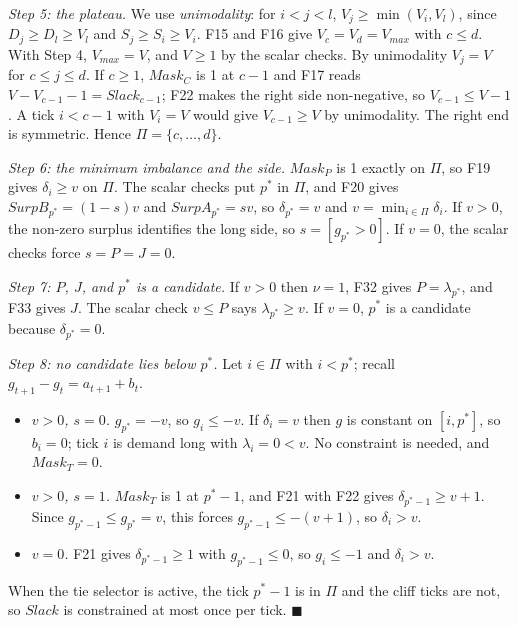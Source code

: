 \emph{Step 5: the plateau.} We use \emph{unimodality}: for \(i < j < l\), \(V_j \ge \min(V_i, V_l)\), since \(D_j \ge D_l \ge V_l\) and \(S_j \ge S_i \ge V_i\). F15 and F16 give \(V_c = V_d = V_{max}\) with \(c \le d\). With Step 4, \(V_{max} = V\), and \(V \ge 1\) by the scalar checks. By unimodality \(V_j = V\) for \(c \le j \le d\). If \(c \ge 1\), \(Mask_C\) is 1 at \(c - 1\) and F17 reads \(V - V_{c-1} - 1 = Slack_{c-1}\); F22 makes the right side non-negative, so \(V_{c-1} \le V - 1\). A tick \(i < c-1\) with \(V_i = V\) would give \(V_{c-1} \ge V\) by unimodality. The right end is symmetric. Hence \(\Pi = \{c, \ldots, d\}\).

\emph{Step 6: the minimum imbalance and the side.} \(Mask_P\) is 1 exactly on \(\Pi\), so F19 gives \(\delta_i \ge v\) on \(\Pi\). The scalar checks put \(p^*\) in \(\Pi\), and F20 gives \(SurpB_{p^*} = (1-s)v\) and \(SurpA_{p^*} = sv\), so \(\delta_{p^*} = v\) and \(v = \min_{i \in \Pi} \delta_i\). If \(v > 0\), the non-zero surplus identifies the long side, so \(s = [g_{p^*} > 0]\). If \(v = 0\), the scalar checks force \(s = P = J = 0\).

\emph{Step 7: \(P\), \(J\), and \(p^*\) is a candidate.} If \(v > 0\) then \(\nu = 1\), F32 gives \(P = \lambda_{p^*}\), and F33 gives \(J\). The scalar check \(v \le P\) says \(\lambda_{p^*} \ge v\). If \(v = 0\), \(p^*\) is a candidate because \(\delta_{p^*} = 0\).

\emph{Step 8: no candidate lies below \(p^*\).} Let \(i \in \Pi\) with \(i < p^*\); recall \(g_{t+1} - g_t = a_{t+1} + b_t\).

\begin{itemize}
\item
  \emph{\(v > 0\), \(s = 0\).} \(g_{p^*} = -v\), so \(g_i \le -v\). If \(\delta_i = v\) then \(g\) is constant on \([i, p^*]\), so \(b_i = 0\); tick \(i\) is demand long with \(\lambda_i = 0 < v\). No constraint is needed, and \(Mask_T = 0\).
\item
  \emph{\(v > 0\), \(s = 1\).} \(Mask_T\) is 1 at \(p^* - 1\), and F21 with F22 gives \(\delta_{p^*-1} \ge v + 1\). Since \(g_{p^*-1} \le g_{p^*} = v\), this forces \(g_{p^*-1} \le -(v+1)\), so \(\delta_i > v\).
\item
  \emph{\(v = 0\).} F21 gives \(\delta_{p^*-1} \ge 1\) with \(g_{p^*-1} \le 0\), so \(g_i \le -1\) and \(\delta_i > v\).
\end{itemize}

When the tie selector is active, the tick \(p^* - 1\) is in \(\Pi\) and the cliff ticks are not, so \(Slack\) is constrained at most once per tick. \(\blacksquare\)

